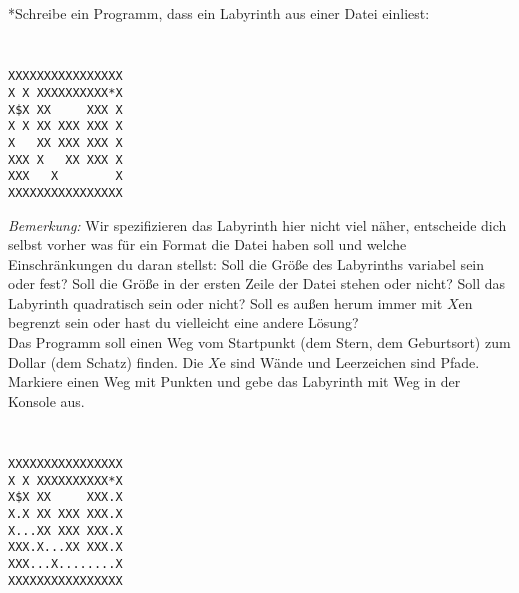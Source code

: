 \documentclass{uebungszettel}
\begin{document}
\newpage
\begin{aufg}
*Schreibe ein Programm, dass ein Labyrinth aus einer Datei einliest:
{\tt
\lstset{language=Delphi}
\begin{lstlisting}
XXXXXXXXXXXXXXXX
X X XXXXXXXXXX*X
X$X XX     XXX X
X X XX XXX XXX X
X   XX XXX XXX X
XXX X   XX XXX X
XXX   X        X
XXXXXXXXXXXXXXXX
\end{lstlisting}
}
\noindent\emph{Bemerkung: } Wir spezifizieren das Labyrinth hier nicht viel näher, entscheide dich selbst vorher was für ein Format die Datei haben soll und welche Einschränkungen du daran stellst: Soll die Größe des Labyrinths variabel sein oder fest? Soll die Größe in der ersten Zeile der Datei stehen oder nicht? Soll das Labyrinth quadratisch sein oder nicht? Soll es außen herum immer mit $X$en begrenzt sein oder hast du vielleicht eine andere Lösung?\\
Das Programm soll einen Weg vom Startpunkt (dem Stern, dem Geburtsort) zum Dollar (dem Schatz) finden. Die $X$e sind Wände und Leerzeichen sind Pfade. Markiere einen Weg mit Punkten und gebe das Labyrinth mit Weg in der Konsole aus.

{\tt
\lstset{language=Delphi}
\begin{lstlisting}
XXXXXXXXXXXXXXXX
X X XXXXXXXXXX*X
X$X XX     XXX.X
X.X XX XXX XXX.X
X...XX XXX XXX.X
XXX.X...XX XXX.X
XXX...X........X
XXXXXXXXXXXXXXXX
\end{lstlisting}
}
\end{aufg}
\end{document}
